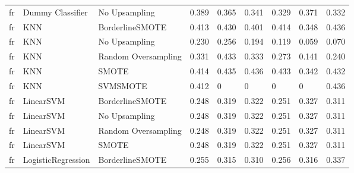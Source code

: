 \begin{tabular}{lllllllll}
      fr &             Dummy Classifier &       No Upsampling & 0.389 &                     0.365 &                 0.341 &                  0.329 &                                   0.371 &     0.332 \\
      fr &                          KNN &     BorderlineSMOTE & 0.413 &                     0.430 &                 0.401 &                  0.414 &                                   0.348 &     0.436 \\
      fr &                          KNN &       No Upsampling & 0.230 &                     0.256 &                 0.194 &                  0.119 &                                   0.059 &     0.070 \\
      fr &                          KNN & Random Oversampling & 0.331 &                     0.433 &                 0.333 &                  0.273 &                                   0.141 &     0.240 \\
      fr &                          KNN &               SMOTE & 0.414 &                     0.435 &                 0.436 &                  0.433 &                                   0.342 &     0.432 \\
      fr &                          KNN &            SVMSMOTE & 0.412 &                         0 &                     0 &                      0 &                                       0 &     0.436 \\
      fr &                    LinearSVM &     BorderlineSMOTE & 0.248 &                     0.319 &                 0.322 &                  0.251 &                                   0.327 &     0.311 \\
      fr &                    LinearSVM &       No Upsampling & 0.248 &                     0.319 &                 0.322 &                  0.251 &                                   0.327 &     0.311 \\
      fr &                    LinearSVM & Random Oversampling & 0.248 &                     0.319 &                 0.322 &                  0.251 &                                   0.327 &     0.311 \\
      fr &                    LinearSVM &               SMOTE & 0.248 &                     0.319 &                 0.322 &                  0.251 &                                   0.327 &     0.311 \\
      fr &           LogisticRegression &     BorderlineSMOTE & 0.255 &                     0.315 &                 0.310 &                  0.256 &                                   0.316 &     0.337 \\

\end{tabular}
